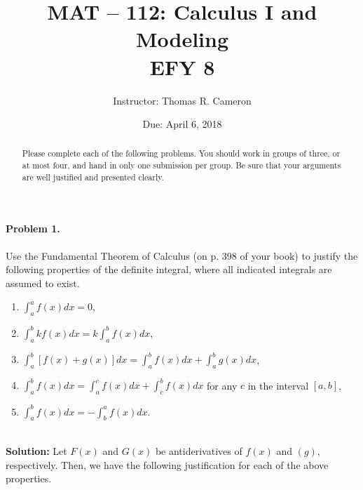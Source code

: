 \documentclass{article}
\title{MAT -- 112: Calculus I and Modeling\\
\large{EFY 8}}
\author{Instructor: Thomas R. Cameron}
\date{Due: April 6, 2018}
\begin{document}
\maketitle

\begin{abstract}
Please complete each of the following problems. You should work in groups of three, or at most four, and hand in only one submission per group. Be sure that your arguments are well justified and presented clearly.
\end{abstract}

\paragraph*{Problem 1.} Use the Fundamental Theorem of Calculus (on p. 398 of your book) to justify the following properties of the definite integral, where all indicated integrals are assumed to exist.
\begin{enumerate}
\item	$\int_{a}^{a}f(x)dx=0$,
\item $\int_{a}^{b}kf(x)dx=k\int_{a}^{b}f(x)dx$,
\item	$\int_{a}^{b}[f(x)+g(x)]dx=\int_{a}^{b}f(x)dx+\int_{a}^{b}g(x)dx$,
\item	$\int_{a}^{b}f(x)dx=\int_{a}^{c}f(x)dx+\int_{c}^{b}f(x)dx$ for any $c$ in the interval $[a,b]$,
\item	$\int_{a}^{b}f(x)dx=-\int_{b}^{a}f(x)dx$.
\end{enumerate}
~\\
\textbf{Solution:} Let $F(x)$ and $G(x)$ be antiderivatives of $f(x)$ and $(g)$, respectively. Then, we have the following justification for each of the above properties. 
\end{document}
